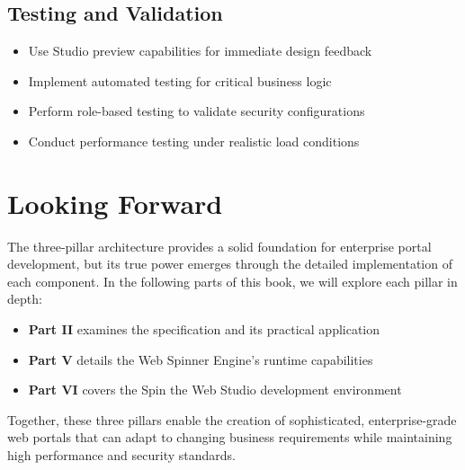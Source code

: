 \subsection{Testing and Validation}

\begin{itemize}
	\item Use Studio preview capabilities for immediate design feedback
	\item Implement automated testing for critical business logic
	\item Perform role-based testing to validate security configurations
	\item Conduct performance testing under realistic load conditions
\end{itemize}

\section{Looking Forward}
\label{sec:architecture-forward}

The three-pillar architecture provides a solid foundation for enterprise portal development, but its true power emerges through the detailed implementation of each component. In the following parts of this book, we will explore each pillar in depth:

\begin{itemize}
	\item \textbf{Part II} examines the \wbdl{} specification and its practical application
	\item \textbf{Part V} details the Web Spinner Engine's runtime capabilities
	\item \textbf{Part VI} covers the Spin the Web Studio development environment
\end{itemize}

Together, these three pillars enable the creation of sophisticated, enterprise-grade web portals that can adapt to changing business requirements while maintaining high performance and security standards.
